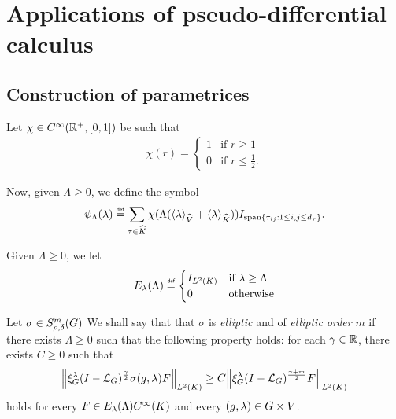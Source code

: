 \chapter{Applications of pseudo-differential calculus}

\section{Construction of parametrices}

Let $\chi \in {C^\infty(\mathbb{R}^+, [0, 1])}$ be such that
\begin{align*}
    \chi(r) =
    \begin{cases}
        1 & \text{if } r \geq 1\\
        0 & \text{if } r \leq \frac 1 2.
    \end{cases}
\end{align*}

Now, given $\Lambda \geq 0$,
we define the symbol
\begin{align*}
    \psi_\Lambda(\lambda)
    \defeq \sum_{\tau \in \dualGroup \CompactGroup}
    \chi(\Lambda(\JapaneseBracket \VectorSpace \lambda + \JapaneseBracket \CompactGroup \lambda)) \Id {\Span \{\tau_{i j} : 1 \leq i, j \leq \dimRep \tau\}}.
\end{align*}

Given $\Lambda \geq 0$,
we let
\begin{align*}
    E_\lambda(\Lambda)
    \defeq
    \begin{cases}
        \Id {\Lebesgue 2 \CompactGroup} & \text{if } \lambda \geq \Lambda\\
        0 & \text{otherwise}
    \end{cases}
\end{align*}

\begin{definition}[Ellipticity]
\label{definition:ellipticity}
    Let $\sigma \in S^{m}_{\rho, \delta}(G)$
    We shall say that that $\sigma$ is \emph{elliptic} and of \emph{elliptic order} $m$
    if there exists $\Lambda \geq 0$ such that the following property holds:
    for each $\gamma \in \mathbb{R}$,
    there exists $C \geq 0$ such that
    \begin{align}
        \norm [\Lebesgue 2 \CompactGroup] {\Rep \lambda \BesselPotential \gamma \sigma(g, \lambda) F}
        \geq C
        \norm [\Lebesgue 2 \CompactGroup] {\Rep \lambda \BesselPotential {\gamma + m} F}
        \label{eq:definition_of_ellipticity}
    \end{align}
    holds for every $F \in E_\lambda(\Lambda) {C^\infty(K)}$
    and every $(g, \lambda) \in G \times V$.
\end{definition}

